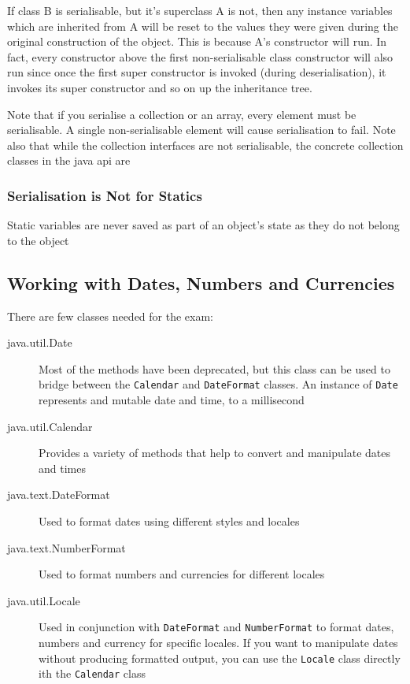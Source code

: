 If class B is serialisable, but it's superclass A is not, then any instance 
variables which are inherited from A will be reset to the values they were 
given during the original construction of the object. This is because A's 
constructor will run. In fact, every constructor above the first 
non-serialisable class constructor will also run since once the first super 
constructor is invoked (during deserialisation), it invokes its super 
constructor and so on up the inheritance tree.

Note that if you serialise a collection or an array, every element must be 
serialisable. A single non-serialisable element will cause serialisation to 
fail. Note also that while the collection interfaces are not serialisable, the 
concrete collection classes in the java api are

\subsubsection{Serialisation is Not for Statics}
Static variables are never saved as part of an object's state as they do not 
belong to the object

\subsection{Working with Dates, Numbers and Currencies}
There are few classes needed for the exam:
\begin{description}
    \item[java.util.Date] Most of the methods have been deprecated, but this 
    class can be used to bridge between the \verb#Calendar# and 
    \verb#DateFormat# classes. An instance of \verb#Date# represents and mutable
    date and time, to a millisecond
    \item[java.util.Calendar] Provides a variety of methods that help to 
    convert and manipulate dates and times
    \item[java.text.DateFormat] Used to format dates using different styles and 
    locales
    \item[java.text.NumberFormat] Used to format numbers and currencies for 
    different locales
    \item[java.util.Locale] Used in conjunction with \verb#DateFormat# and 
    \verb#NumberFormat# to format dates, numbers and currency for specific 
    locales. If you want to manipulate dates without producing formatted 
    output, you can use the \verb#Locale# class directly ith the 
    \verb#Calendar# class
\end{description}

